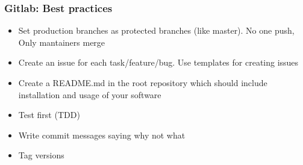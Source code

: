 \begin{frame}

\frametitle{Gitlab: Best practices}

\begin{itemize}[<+->]
\item Set production branches as protected branches (like master). No one push, Only mantainers merge
\item Create an issue for each task/feature/bug. Use templates for creating issues
\item Create a README.md in the root repository which should include installation and usage of your software
\item Test first (TDD)
\item Write commit messages saying why not what
\item Tag versions
\end{itemize}

\end{frame}